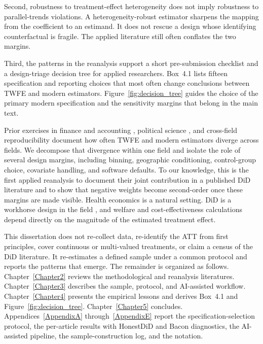 \documentclass[11pt]{article}
\begin{document}
Second, robustness to treatment-effect heterogeneity does not imply robustness to parallel-trends violations. A heterogeneity-robust estimator sharpens the mapping from the coefficient to an estimand. It does not rescue a design whose identifying counterfactual is fragile. The applied literature still often conflates the two margins.

Third, the patterns in the reanalysis support a short pre-submission checklist and a design-triage decision tree for applied researchers. Box~4.1 lists fifteen specification and reporting choices that most often change conclusions between TWFE and modern estimators. Figure~\ref{fig:decision_tree} guides the choice of the primary modern specification and the sensitivity margins that belong in the main text.

Prior exercises in finance and accounting \parencite{baker2022much}, political science \parencite{chiu2026causal}, and cross-field reproducibility \parencite{brodeur2026reproducibility} document how often TWFE and modern estimators diverge across fields. We decompose that divergence within one field and isolate the role of several design margins, including binning, geographic conditioning, control-group choice, covariate handling, and software defaults. To our knowledge, this is the first applied reanalysis to document their joint contribution in a published DiD literature and to show that negative weights become second-order once these margins are made visible. Health economics is a natural setting. DiD is a workhorse design in the field \parencite{goldsmith2024tracking}, and welfare and cost-effectiveness calculations depend directly on the magnitude of the estimated treatment effect.

This dissertation does not re-collect data, re-identify the ATT from first principles, cover continuous or multi-valued treatments, or claim a census of the DiD literature. It re-estimates a defined sample under a common protocol and reports the patterns that emerge. The remainder is organized as follows. Chapter~\ref{Chapter2} reviews the methodological and reanalysis literatures. Chapter~\ref{Chapter3} describes the sample, protocol, and AI-assisted workflow. Chapter~\ref{Chapter4} presents the empirical lessons and derives Box~4.1 and Figure~\ref{fig:decision_tree}. Chapter~\ref{Chapter5} concludes. Appendices~\ref{AppendixA} through~\ref{AppendixE} report the specification-selection protocol, the per-article results with HonestDiD and Bacon diagnostics, the AI-assisted pipeline, the sample-construction log, and the notation.
\end{document}

